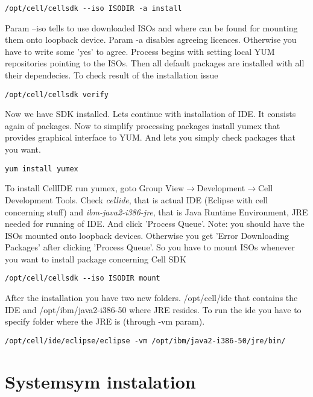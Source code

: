 \begin{verbatim}
/opt/cell/cellsdk --iso ISODIR -a install
\end{verbatim}

Param --iso tells to use downloaded ISOs and where can be found for mounting them onto loopback device. Param -a disables agreeing licences. Otherwise you have to write some 'yes' to agree. Process begins with setting local YUM repositories pointing to the ISOs. Then all default packages are installed with all their dependecies. To check result of the installation issue

\begin{verbatim}
/opt/cell/cellsdk verify
\end{verbatim}

Now we have SDK installed. Lets continue with installation of IDE. It consists again of packages. Now to simplify processing packages install yumex that provides graphical interface to YUM. And lets you simply check packages that you want.

\begin{verbatim}
yum install yumex
\end{verbatim}

To install CellIDE run yumex, goto Group View$\rightarrow$Development$\rightarrow$Cell Development Tools. Check \textit{cellide}, that is actual IDE (Eclipse with cell concerning stuff) and \textit{ibm-java2-i386-jre}, that is Java Runtime Environment, JRE needed for running of IDE. And click 'Process Queue'. Note: you should have the ISOs mounted onto loopback devices. Otherwise you get 'Error Downloading Packages' after clicking 'Process Queue'. So you have to mount ISOs whenever you want to install package concerning Cell SDK

\begin{verbatim}
/opt/cell/cellsdk --iso ISODIR mount
\end{verbatim}

After the installation you have two new folders. /opt/cell/ide that contains the IDE and /opt/ibm/java2-i386-50 where JRE resides. To run the ide you have to specify folder where the JRE is (through -vm param).

\begin{verbatim}
/opt/cell/ide/eclipse/eclipse -vm /opt/ibm/java2-i386-50/jre/bin/
\end{verbatim}

\section{Systemsym instalation}

